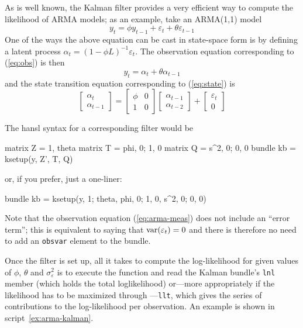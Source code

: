 As is well known, the Kalman filter provides a very efficient way to
compute the likelihood of ARMA models; as an example, take an
ARMA(1,1) model
\[
  y_t = \phi y_{t-1} + \varepsilon_t + \theta \varepsilon_{t-1}
\]
One of the ways the above equation can be cast in state-space form is
by defining a latent process $\alpha_t = (1 - \phi L)^{-1}
\varepsilon_t$.   The observation equation corresponding to (\ref{eq:obs})
is then
%
\begin{equation}
y_t = \alpha_t + \theta \alpha_{t-1} \label{eq:arma-meas}
\end{equation}
%
and the state transition equation corresponding to (\ref{eq:state}) is
%
\[
  \left[ \begin{array}{c} \alpha_t \\ \alpha_{t-1} \end{array} \right] =
  \left[ \begin{array}{cc} \phi & 0 \\ 1 & 0 \end{array} \right]
  \left[ \begin{array}{c} \alpha_{t-1} \\ \alpha_{t-2} \end{array} \right] +
  \left[ \begin{array}{c} \varepsilon_t \\ 0 \end{array} \right]
\]

The \textsf{hansl} syntax for a corresponding filter would be
\begin{code}
matrix Z = {1, theta}
matrix T = {phi, 0; 1, 0}
matrix Q = {s^2, 0; 0, 0}
bundle kb = ksetup(y, Z', T, Q)
\end{code}
%
or, if you prefer, just a one-liner:
\begin{code}
bundle kb = ksetup(y, {1; theta}, {phi, 0; 1, 0}, {s^2, 0; 0, 0})
\end{code}

Note that the observation equation (\ref{eq:arma-meas}) does not
include an ``error term''; this is equivalent to saying that
$\mbox{var}(\varepsilon_t) = 0$ and there is therefore no need to add
an \texttt{obsvar} element to the bundle.

Once the filter is set up, all it takes to compute the log-likelihood
for given values of $\phi$, $\theta$ and $\sigma^2_{\varepsilon}$ is
to execute the  function and read the Kalman bundle's
\texttt{lnl} member (which holds the total loglikelihood) or---more
appropriately if the likelihood has to be maximized through
---\texttt{llt}, which gives the series of contributions to
the log-likelihood per observation. An example is shown in
script~\ref{ex:arma-kalman}.

